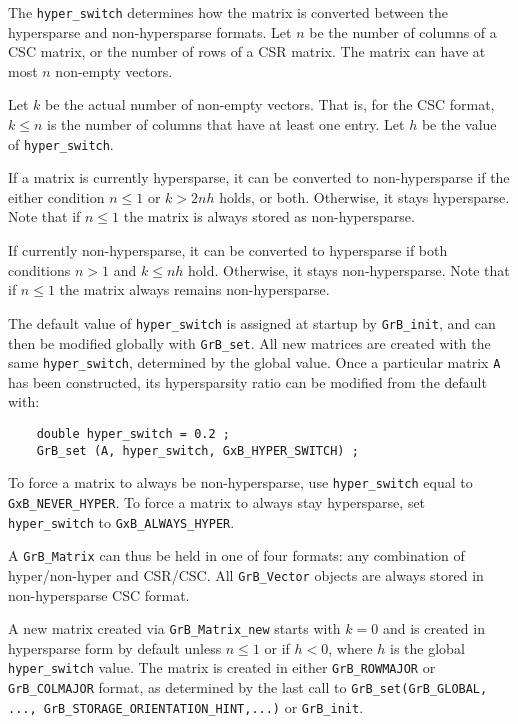 The \verb'hyper_switch' determines how the matrix is converted between the
hypersparse and non-hypersparse formats.  Let $n$ be the number of columns of a
CSC matrix, or the number of rows of a CSR matrix.  The matrix can have at most
$n$ non-empty vectors.

Let $k$ be the actual number of non-empty vectors.  That is, for the CSC
format, $k \le n$ is the number of columns that have at least one entry.  Let
$h$ be the value of \verb'hyper_switch'.

If a matrix is currently hypersparse, it can be converted to non-hypersparse if
the either condition $n \le 1$ or $k > 2nh$ holds, or both.  Otherwise, it
stays hypersparse.  Note that if $n \le 1$ the matrix is always stored as
non-hypersparse.

If currently non-hypersparse, it can be converted to hypersparse if
both conditions $n > 1$ and $k \le nh$ hold.  Otherwise, it stays
non-hypersparse.  Note that if $n \le 1$ the matrix always remains
non-hypersparse.

The default value of \verb'hyper_switch' is assigned at startup by
\verb'GrB_init', and can then be modified globally with \verb'GrB_set'.  All
new matrices are created with the same \verb'hyper_switch', determined by the
global value.  Once a particular matrix \verb'A' has been constructed, its
hypersparsity ratio can be modified from the default with:

    {\footnotesize
    \begin{verbatim}
    double hyper_switch = 0.2 ;
    GrB_set (A, hyper_switch, GxB_HYPER_SWITCH) ; \end{verbatim}}

To force a matrix to always be non-hypersparse, use \verb'hyper_switch' equal to
\verb'GxB_NEVER_HYPER'.  To force a matrix to always stay hypersparse, set
\verb'hyper_switch' to \verb'GxB_ALWAYS_HYPER'.

A \verb'GrB_Matrix' can thus be held in one of four formats: any combination of
hyper/non-hyper and CSR/CSC.  All \verb'GrB_Vector' objects are always stored
in non-hypersparse CSC format.

A new matrix created via \verb'GrB_Matrix_new' starts with $k=0$ and is created
in hypersparse form by default unless $n \le 1$ or if $h<0$, where $h$ is the
global \verb'hyper_switch' value.  The matrix is created in either
\verb'GrB_ROWMAJOR' or \verb'GrB_COLMAJOR' format, as determined by the last call
to
\verb'GrB_set(GrB_GLOBAL,' \verb'..., GrB_STORAGE_ORIENTATION_HINT,...)' or \verb'GrB_init'.

